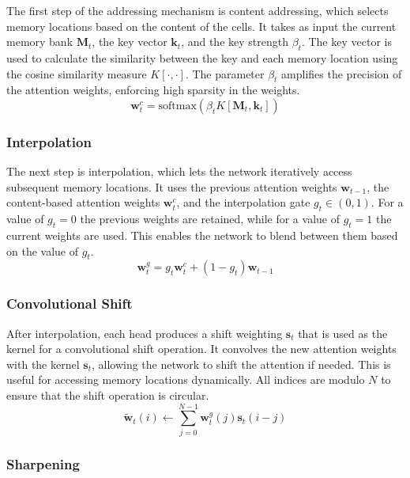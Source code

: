 \documentclass{article}
\begin{document}
The first step of the addressing mechanism is content addressing, which selects memory
locations based on the content of the cells. It takes as input the current memory bank
$\textbf{M}_t$, the key vector $\textbf{k}_t$, and the key strength $\beta_t$. The key
vector is used to calculate the similarity between the key and each memory location using
the cosine similarity measure $K[\cdot, \cdot]$. The parameter $\beta_t$ amplifies the
precision of the attention weights, enforcing high sparsity in the weights.
\begin{equation}
  \textbf{w}_t^c = \text{softmax}(\beta_t K[\textbf{M}_t, \textbf{k}_t])
\end{equation}


\subsubsection{Interpolation}
\label{sec:4.1.1}

The next step is interpolation, which lets the network iteratively access subsequent
memory locations. It uses the previous attention weights $\textbf{w}_{t-1}$, the
content-based attention weights $\textbf{w}_t^c$, and the interpolation gate $g_t \in (0,
  1)$. For a value of $g_t = 0$ the previous weights are retained, while for a value of $g_t
  = 1$ the current weights are used. This enables the network to blend between them based on
the value of $g_t$.
\begin{equation}
  \textbf{w}_t^g = g_t \textbf{w}_t^c + (1 - g_t) \textbf{w}_{t-1}
\end{equation}


\subsubsection{Convolutional Shift}
\label{sec:4.1.2}

After interpolation, each head produces a shift weighting $\textbf{s}_t$ that is used as
the kernel for a convolutional shift operation. It convolves the new attention weights
with the kernel $\textbf{s}_t$, allowing the network to shift the attention if needed.
This is useful for accessing memory locations dynamically. All indices are modulo
$N$ to ensure that the shift operation is circular.
\begin{equation}
  \tilde{\textbf{w}}_t(i) \leftarrow \sum_{j=0}^{N-1} \textbf{w}_t^g(j) \textbf{s}_t(i-j)
\end{equation}


\subsubsection{Sharpening}
\label{sec:4.1.3}
\end{document}

